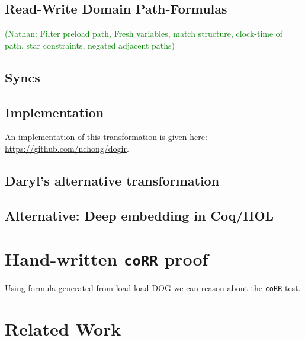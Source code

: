 \documentclass[10pt]{paper}
\newcommand{\litmus}[1]{\texttt{#1}}
\newcommand{\NCComment}[1]{\textcolor{green}{(Nathan: #1)}}
\begin{document}
\subsection{Read-Write Domain Path-Formulas}
%
\NCComment{Filter preload path, Fresh variables, match structure, clock-time of path, star constraints, negated adjacent paths}

\subsection{Syncs}

\subsection{Implementation}

An implementation of this transformation is given here: \url{https://github.com/nchong/dogir}.

\subsection{Daryl's alternative transformation}

\subsection{Alternative: Deep embedding in Coq/HOL}

\section{Hand-written \litmus{coRR} proof}
%
Using formula generated from load-load DOG we can reason about the \litmus{coRR} test.

\section{Related Work}
\end{document}
